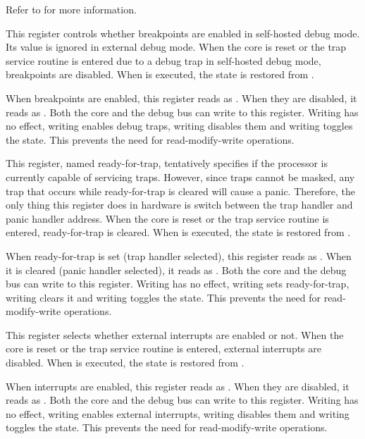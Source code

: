 Refer to  for more information.

\debugCanWrite{}
\coreCanWrite{}
This register controls whether breakpoints are enabled in self-hosted debug 
mode. Its value is ignored in external debug mode. When the core is reset or the 
trap service routine is entered due to a debug trap in self-hosted debug mode, 
breakpoints are disabled. When  is executed, the state is restored 
from .

When breakpoints are enabled, this register reads as . When they are 
disabled, it reads as . Both the core and the debug bus can write to 
this register. Writing  has no effect, writing  enables debug 
traps, writing  disables them and writing  toggles the state. 
This prevents the need for read-modify-write operations.

\debugCanWrite{}
\coreCanWrite{}
This register, named ready-for-trap, tentatively specifies if the processor is
currently capable of servicing traps. However, since traps cannot be masked,
any trap that occurs while ready-for-trap is cleared will cause a panic.
Therefore, the only thing this register does in hardware is switch between the
trap handler and panic handler address. When the core is reset or the trap
service routine is entered, ready-for-trap is cleared. When  is 
executed, the state is restored from .

When ready-for-trap is set (trap handler selected), this register reads as 
. When it is cleared (panic handler selected), it reads as . 
Both the core and the debug bus can write to this register. Writing  
has no effect, writing  sets ready-for-trap, writing  clears 
it and writing  toggles the state. This prevents the need for 
read-modify-write operations.

\debugCanWrite{}
\coreCanWrite{}
This register selects whether external interrupts are enabled or not. When the 
core is reset or the trap service routine is entered, external interrupts are 
disabled. When  is executed, the state is restored from .

When interrupts are enabled, this register reads as . When they are 
disabled, it reads as . Both the core and the debug bus can write to 
this register. Writing  has no effect, writing  enables 
external interrupts, writing  disables them and writing  
toggles the state. This prevents the need for read-modify-write operations.

